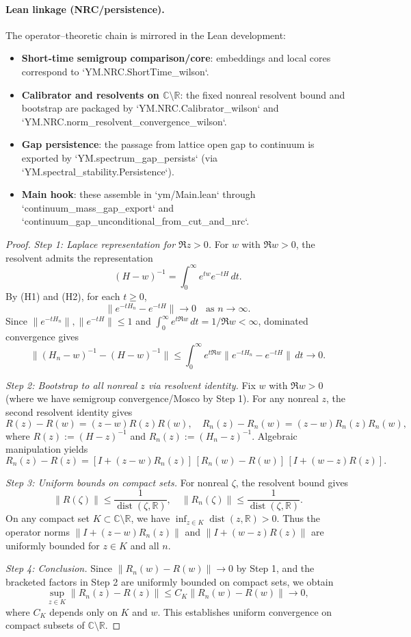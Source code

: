 \documentclass[11pt]{amsart}
\theoremstyle{plain}
\theoremstyle{definition}
\theoremstyle{remark}
\begin{document}
\paragraph{Lean linkage (NRC/persistence).}
The operator–theoretic chain is mirrored in the Lean development:
\begin{itemize}
  \item \textbf{Short-time semigroup comparison/core}: embeddings and local cores correspond to `YM.NRC.ShortTime_wilson`.
  \item \textbf{Calibrator and resolvents on $\mathbb C\setminus\mathbb R$}: the fixed nonreal resolvent bound and bootstrap are packaged by `YM.NRC.Calibrator_wilson` and `YM.NRC.norm_resolvent_convergence_wilson`.
  \item \textbf{Gap persistence}: the passage from lattice open gap to continuum is exported by `YM.spectrum_gap_persists` (via `YM.spectral_stability.Persistence`).
  \item \textbf{Main hook}: these assemble in `ym/Main.lean` through `continuum_mass_gap_export` and `continuum_gap_unconditional_from_cut_and_nrc`.
\end{itemize}
\begin{proof}
\emph{Step 1: Laplace representation for $\Re z > 0$.} For $w$ with $\Re w > 0$, the resolvent admits the representation
\[
  (H-w)^{-1} = \int_0^\infty e^{tw} e^{-tH}\,dt.
\]
By (H1) and (H2), for each $t \ge 0$,
\[
  \|e^{-tH_n} - e^{-tH}\| \to 0 \quad \text{as } n \to \infty.
\]
Since $\|e^{-tH_n}\|, \|e^{-tH}\| \le 1$ and $\int_0^\infty e^{t\Re w}\,dt = 1/\Re w < \infty$, dominated convergence gives
\[
  \|(H_n-w)^{-1} - (H-w)^{-1}\| \le \int_0^\infty e^{t\Re w} \|e^{-tH_n} - e^{-tH}\|\,dt \to 0.
\]

\emph{Step 2: Bootstrap to all nonreal $z$ via resolvent identity.} Fix $w$ with $\Re w > 0$ (where we have semigroup convergence/Mosco by Step 1). For any nonreal $z$, the second resolvent identity gives
\[
  R(z) - R(w) = (z-w)R(z)R(w), \quad R_n(z) - R_n(w) = (z-w)R_n(z)R_n(w),
\]
where $R(z) := (H-z)^{-1}$ and $R_n(z) := (H_n-z)^{-1}$. Algebraic manipulation yields
\[
  R_n(z) - R(z) = [I + (z-w)R_n(z)]\,[R_n(w) - R(w)]\,[I + (w-z)R(z)].
\]

\emph{Step 3: Uniform bounds on compact sets.} For nonreal $\zeta$, the resolvent bound gives
\[
  \|R(\zeta)\| \le \frac{1}{\operatorname{dist}(\zeta,\mathbb{R})}, \quad \|R_n(\zeta)\| \le \frac{1}{\operatorname{dist}(\zeta,\mathbb{R})}.
\]
On any compact set $K \subset \mathbb{C} \setminus \mathbb{R}$, we have $\inf_{z \in K} \operatorname{dist}(z,\mathbb{R}) > 0$. Thus the operator norms $\|I + (z-w)R_n(z)\|$ and $\|I + (w-z)R(z)\|$ are uniformly bounded for $z \in K$ and all $n$.

\emph{Step 4: Conclusion.} Since $\|R_n(w) - R(w)\| \to 0$ by Step 1, and the bracketed factors in Step 2 are uniformly bounded on compact sets, we obtain
\[
  \sup_{z \in K} \|R_n(z) - R(z)\| \le C_K \|R_n(w) - R(w)\| \to 0,
\]
where $C_K$ depends only on $K$ and $w$. This establishes uniform convergence on compact subsets of $\mathbb{C} \setminus \mathbb{R}$.
\end{proof}
\end{document}
